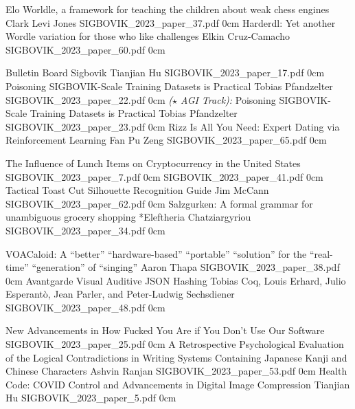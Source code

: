 \addpaper
	{Elo Worldle, a framework for teaching the children about weak chess engines}
	{Clark Levi Jones}
	{}
	{SIGBOVIK_2023_paper_37.pdf}
	{0cm}
	{}
\addpaper
	{Harderdl: Yet another Wordle variation for those who like challenges}
	{Elkin Cruz-Camacho}
	{}
	{SIGBOVIK_2023_paper_60.pdf}
	{0cm}
	{}

\addpaper
	{Bulletin Board Sigbovik}
	{Tianjian Hu}
	{}
	{SIGBOVIK_2023_paper_17.pdf}
	{0cm}
	{}
\addpaper
	{Poisoning SIGBOVIK-Scale Training Datasets is Practical}
	{Tobias Pfandzelter}
	{}
	{SIGBOVIK_2023_paper_22.pdf}
	{0cm}
	{}
\addpaper
	{\emph{($\star$ AGI Track):} Poisoning SIGBOVIK-Scale Training Datasets is Practical}
	{Tobias Pfandzelter}
	{}
	{SIGBOVIK_2023_paper_23.pdf}
	{0cm}
	{}
\addpaper
	{Rizz Is All You Need: Expert Dating via Reinforcement Learning}
	{Fan Pu Zeng}
	{}
	{SIGBOVIK_2023_paper_65.pdf}
	{0cm}
	{}


\addpaper
	{The Influence of Lunch Items on Cryptocurrency in the United States}
	{}
	{}
	{SIGBOVIK_2023_paper_7.pdf}
	{0cm}
	{}
\addpaper
	{}
	{}
	{}
	{SIGBOVIK_2023_paper_41.pdf}
	{0cm}
	{}
\addpaper
	{Tactical Toast Cut Silhouette Recognition Guide}
	{Jim McCann}
	{}
	{SIGBOVIK_2023_paper_62.pdf}
	{0cm}
	{}
\addpaper
	{Salzgurken: A formal grammar for unambiguous grocery shopping}
	{*Eleftheria Chatziargyriou}
	{}
	{SIGBOVIK_2023_paper_34.pdf}
	{0cm}
	{}

\addpaper
	{VOACaloid: A ``better'' ``hardware-based'' ``portable'' ``solution'' for the ``real-time'' ``generation'' of ``singing''}
	{Aaron Thapa}
	{}
	{SIGBOVIK_2023_paper_38.pdf}
	{0cm}
	{}
\addpaper
	{Avantgarde Visual Auditive JSON Hashing}
	{Tobias Coq, Louis Erhard, Julio Esperantò, Jean Parler, and Peter-Ludwig Sechsdiener}
	{}
	{SIGBOVIK_2023_paper_48.pdf}
	{0cm}
	{}



\addpaper
	{New Advancements in How Fucked You Are if You Don’t Use Our Software}
	{}
	{}
	{SIGBOVIK_2023_paper_25.pdf}
	{0cm}
	{}
\addpaper
	{A Retrospective Psychological Evaluation of the Logical Contradictions in Writing Systems Containing Japanese Kanji and Chinese Characters}
	{Ashvin Ranjan}
	{}
	{SIGBOVIK_2023_paper_53.pdf}
	{0cm}
	{}
\addpaper
	{Health Code: COVID Control and Advancements in Digital Image Compression}
	{Tianjian Hu}
	{}
	{SIGBOVIK_2023_paper_5.pdf}
	{0cm}
	{}
